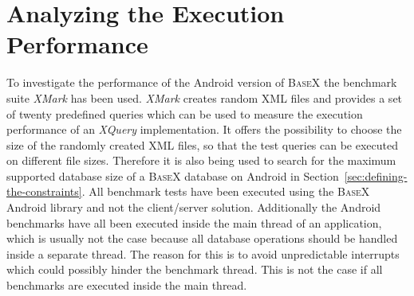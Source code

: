 \section{Analyzing the Execution Performance}
\label{sec:analysing-the-execution-performance}
To investigate the performance of the Android version of \textsc{BaseX} the benchmark suite \textit{XMark} has been used.
\textit{XMark} creates random XML files and provides a set of twenty predefined queries which can be used to measure the execution performance of an \textit{XQuery} implementation.
It offers the possibility to choose the size of the randomly created XML files, so that the test queries can be executed on different file sizes.
Therefore it is also being used to search for the maximum supported database size of a \textsc{BaseX} database on Android in Section~\ref{sec:defining-the-constraints}.
All benchmark tests have been executed using the \textsc{BaseX} Android library and not the client/server solution.
Additionally the Android benchmarks have all been executed inside the main thread of an application, which is usually not the case because all database operations should be handled inside a separate thread.
The reason for this is to avoid unpredictable interrupts which could possibly hinder the benchmark thread. 
This is not the case if all benchmarks are executed inside the main thread.


